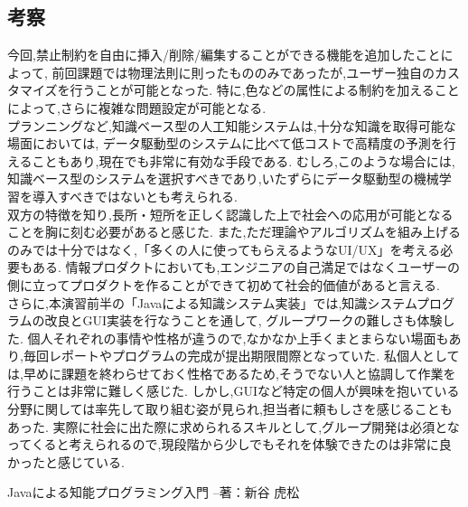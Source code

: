 \documentclass[uplatex,12pt]{jsarticle}
\begin{document}
\subsection{考察}
今回,禁止制約を自由に挿入/削除/編集することができる機能を追加したことによって,
前回課題では物理法則に則ったもののみであったが,ユーザー独自のカスタマイズを行うことが可能となった.
特に,色などの属性による制約を加えることによって,さらに複雑な問題設定が可能となる. \\
プランニングなど,知識ベース型の人工知能システムは,十分な知識を取得可能な場面においては,
データ駆動型のシステムに比べて低コストで高精度の予測を行えることもあり,現在でも非常に有効な手段である.
むしろ,このような場合には,知識ベース型のシステムを選択すべきであり,いたずらにデータ駆動型の機械学習を導入すべきではないとも考えられる. \\
双方の特徴を知り,長所・短所を正しく認識した上で社会への応用が可能となることを胸に刻む必要があると感じた.
また,ただ理論やアルゴリズムを組み上げるのみでは十分ではなく,「多くの人に使ってもらえるようなUI/UX」を考える必要もある.
情報プロダクトにおいても,エンジニアの自己満足ではなくユーザーの側に立ってプロダクトを作ることができて初めて社会的価値があると言える. \\
さらに,本演習前半の「Javaによる知識システム実装」では,知識システムプログラムの改良とGUI実装を行なうことを通して,
グループワークの難しさも体験した.
個人それぞれの事情や性格が違うので,なかなか上手くまとまらない場面もあり,毎回レポートやプログラムの完成が提出期限間際となっていた.
私個人としては,早めに課題を終わらせておく性格であるため,そうでない人と協調して作業を行うことは非常に難しく感じた.
しかし,GUIなど特定の個人が興味を抱いている分野に関しては率先して取り組む姿が見られ,担当者に頼もしさを感じることもあった.
実際に社会に出た際に求められるスキルとして,グループ開発は必須となってくると考えられるので,現段階から少しでもそれを体験できたのは非常に良かったと感じている.


\begin{thebibliography}{99}
 Javaによる知能プログラミング入門 --著：新谷 虎松 \\
\end{thebibliography}
\end{document}
